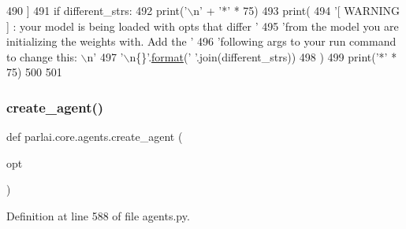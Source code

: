 \begin{DoxyCode}
490     ]
491     \textcolor{keywordflow}{if} different\_strs:
492         print(\textcolor{stringliteral}{'\(\backslash\)n'} + \textcolor{stringliteral}{'*'} * 75)
493         print(
494             \textcolor{stringliteral}{'[ WARNING ] : your model is being loaded with opts that differ '}
495             \textcolor{stringliteral}{'from the model you are initializing the weights with. Add the '}
496             \textcolor{stringliteral}{'following args to your run command to change this: \(\backslash\)n'}
497             \textcolor{stringliteral}{'\(\backslash\)n\{\}'}.\hyperlink{namespaceparlai_1_1chat__service_1_1services_1_1messenger_1_1shared__utils_a32e2e2022b824fbaf80c747160b52a76}{format}(\textcolor{stringliteral}{' '}.join(different\_strs))
498         )
499         print(\textcolor{stringliteral}{'*'} * 75)
500 
501 
\end{DoxyCode}
\mbox{\label{namespaceparlai_1_1core_1_1agents_a00d77a7e26fb89e8bd900f7b2a02982a}} 
\subsubsection{\texorpdfstring{create\+\_\+agent()}{create\_agent()}}
{\footnotesize\ttfamily def parlai.\+core.\+agents.\+create\+\_\+agent (\begin{DoxyParamCaption}\item[{}]{opt }\end{DoxyParamCaption})}



Definition at line 588 of file agents.\+py.


